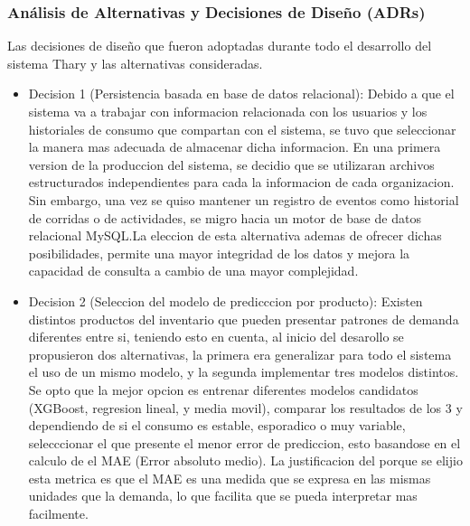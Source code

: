 \subsubsection{Análisis de Alternativas y Decisiones de Diseño (ADRs)}

Las decisiones de diseño que fueron adoptadas durante todo el desarrollo del sistema Thary y las alternativas consideradas.

\begin{itemize}
    \item Decision 1 (Persistencia basada en base de datos relacional): Debido a que el sistema va a trabajar con informacion relacionada con los usuarios y los historiales de consumo que compartan con el sistema, se tuvo que seleccionar la manera mas adecuada de almacenar dicha informacion. En una primera version de la produccion del sistema, se decidio que se utilizaran archivos estructurados independientes para cada la informacion de cada organizacion. Sin embargo, una vez se quiso mantener un registro de eventos como historial de corridas o de actividades, se migro hacia un motor de base de datos relacional MySQL.La eleccion de esta alternativa ademas de ofrecer dichas posibilidades, permite una mayor integridad de los datos y mejora la capacidad de consulta a cambio de una mayor complejidad.
    
    \item Decision 2 (Seleccion del modelo de predicccion por producto): Existen distintos productos del inventario que pueden presentar patrones de demanda diferentes entre si, teniendo esto en cuenta, al inicio del desarollo se propusieron dos alternativas, la primera era generalizar para todo el sistema el uso de un mismo modelo, y la segunda implementar tres modelos distintos. Se opto que la mejor opcion es entrenar diferentes modelos candidatos (XGBoost, regresion lineal, y media movil), comparar los resultados de los 3 y dependiendo de si el consumo es estable, esporadico o muy variable, selecccionar el que presente el menor error de prediccion, esto basandose en el calculo de el MAE (Error absoluto medio). La justificacion del porque se elijio esta metrica es que el MAE es una medida que se expresa en las mismas unidades que la demanda, lo que facilita que se pueda interpretar mas facilmente.
    

\end{itemize}
